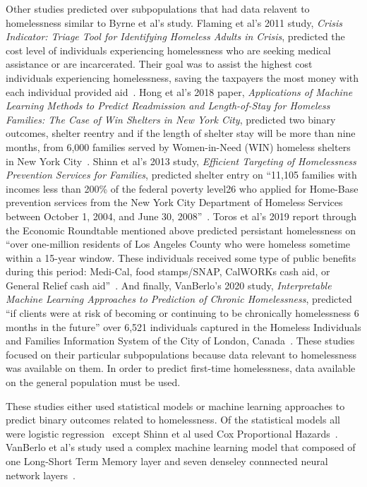 \documentclass[10pt,letterpaper]{article}
\begin{document}
Other studies predicted over subpopulations that had data relavent to homelessness similar to Byrne et al's study. Flaming et al's 2011 study, \textit{Crisis Indicator: Triage Tool for Identifying Homeless Adults in Crisis}, predicted the cost level of individuals experiencing homelessness who are seeking medical assistance or are incarcerated. Their goal was to assist the highest cost individuals experiencing homelessness, saving the taxpayers the most money with each individual provided aid~\cite{flaming2011crisis}. Hong et al's 2018 paper, \textit{Applications of Machine Learning Methods to Predict Readmission and Length-of-Stay for Homeless Families: The Case of Win Shelters in New York City}, predicted two binary outcomes, shelter reentry and if the length of shelter stay will be more than nine months, from 6,000 families served by Women-in-Need (WIN) homeless shelters in New York City~\cite{hong2018applications}. Shinn et al's 2013 study, \textit{Efficient Targeting of Homelessness Prevention Services for Families}, predicted shelter entry on ``11,105 families with incomes less than 200\% of the federal poverty level26 who applied for Home-Base prevention services from the New York City Department of Homeless Services between October 1, 2004, and June 30, 2008''~\cite{shinn2013efficient}. Toros et al's 2019 report through the Economic Roundtable mentioned above predicted persistant homelessness on ``over one-million residents of Los Angeles County who were homeless sometime within a 15-year window. These  individuals received some type of public benefits during this period: Medi-Cal, food  stamps/SNAP, CalWORKs cash aid, or General Relief cash aid''~\cite{toros2019early}. And finally, VanBerlo's 2020 study, \textit{Interpretable Machine Learning Approaches to Prediction of Chronic Homelessness}, predicted ``if clients were at risk of becoming or continuing to be chronically homelessness 6 months in the future'' over 6,521 individuals captured in the Homeless Individuals and Families Information System of the City of London, Canada~\cite{vanberlo2021interpretable}. These studies focused on their particular subpopulations because data relevant to homelessness was available on them. In order to predict first-time homelessness, data available on the general population must be used.

These studies either used statistical models or machine learning approaches to predict binary outcomes related to homelessness. Of the statistical models all were logistic regression~\cite{byrne2020classification,flaming2011crisis,hong2018applications,toros2019early} except Shinn et al used Cox Proportional Hazards~\cite{shinn2013efficient}. VanBerlo et al's study used a complex machine learning model that composed of one Long-Short Term Memory layer and seven denseley connnected neural network layers~\cite{vanberlo2021interpretable}. 
\end{document}
